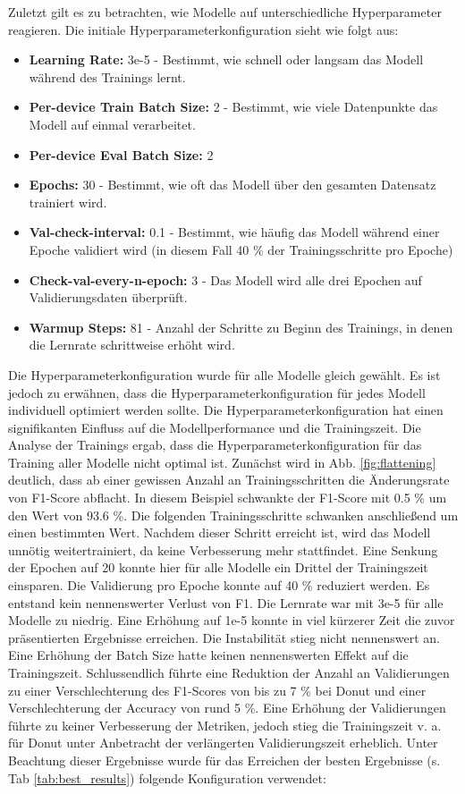Zuletzt gilt es zu betrachten, wie Modelle auf unterschiedliche Hyperparameter reagieren. Die initiale Hyperparameterkonfiguration sieht wie folgt aus:
\begin{itemize}
    \item \textbf{Learning Rate:} 3e-5 - Bestimmt, wie schnell oder langsam das Modell während des Trainings lernt.
    \item \textbf{Per-device Train Batch Size:} 2 - Bestimmt, wie viele Datenpunkte das Modell auf einmal verarbeitet.
    \item \textbf{Per-device Eval Batch Size:} 2
    \item \textbf{Epochs:} 30 - Bestimmt, wie oft das Modell über den gesamten Datensatz trainiert wird.
    \item \textbf{Val-check-interval:} 0.1 - Bestimmt, wie häufig das Modell während einer Epoche validiert wird (in diesem Fall 40 \% der Trainingsschritte pro Epoche)
    \item \textbf{Check-val-every-n-epoch:} 3 - Das Modell wird alle drei Epochen auf Validierungsdaten überprüft. 
    \item \textbf{Warmup Steps:} 81 - Anzahl der Schritte zu Beginn des Trainings, in denen die Lernrate schrittweise erhöht wird. 
\end{itemize}
Die Hyperparameterkonfiguration wurde für alle Modelle gleich gewählt. Es ist jedoch zu erwähnen, dass die Hyperparameterkonfiguration für jedes Modell individuell optimiert werden sollte. Die Hyperparameterkonfiguration hat einen signifikanten Einfluss auf die Modellperformance und die Trainingszeit. Die Analyse der Trainings ergab, dass die Hyperparameterkonfiguration für das Training aller Modelle nicht optimal ist. Zunächst wird in Abb. \ref{fig:flattening} deutlich, dass ab einer gewissen Anzahl an Trainingsschritten die Änderungsrate von F1-Score abflacht. In diesem Beispiel schwankte der F1-Score mit 0.5 \% um den Wert von 93.6 \%. Die folgenden Trainingsschritte schwanken anschließend um einen bestimmten Wert. Nachdem dieser Schritt erreicht ist, wird das Modell unnötig weitertrainiert, da keine Verbesserung mehr stattfindet. Eine Senkung der Epochen auf 20 konnte hier für alle Modelle ein Drittel der Trainingszeit einsparen. Die Validierung pro Epoche konnte auf 40 \% reduziert werden. Es entstand kein nennenswerter Verlust von F1. Die Lernrate war mit 3e-5 für alle Modelle zu niedrig. Eine Erhöhung auf 1e-5 konnte in viel kürzerer Zeit die zuvor präsentierten Ergebnisse erreichen. Die Instabilität stieg nicht nennenswert an. Eine Erhöhung der Batch Size hatte keinen nennenswerten Effekt auf die Trainingszeit. Schlussendlich führte eine Reduktion der Anzahl an Validierungen zu einer Verschlechterung des F1-Scores von bis zu 7 \% bei Donut und einer Verschlechterung der Accuracy von rund 5 \%. Eine Erhöhung der Validierungen führte zu keiner Verbesserung der Metriken, jedoch stieg die Trainingszeit v. a. für Donut unter Anbetracht der verlängerten Validierungszeit erheblich. Unter Beachtung dieser Ergebnisse wurde für das Erreichen der besten Ergebnisse (s. Tab \ref{tab:best_results}) folgende Konfiguration verwendet:
